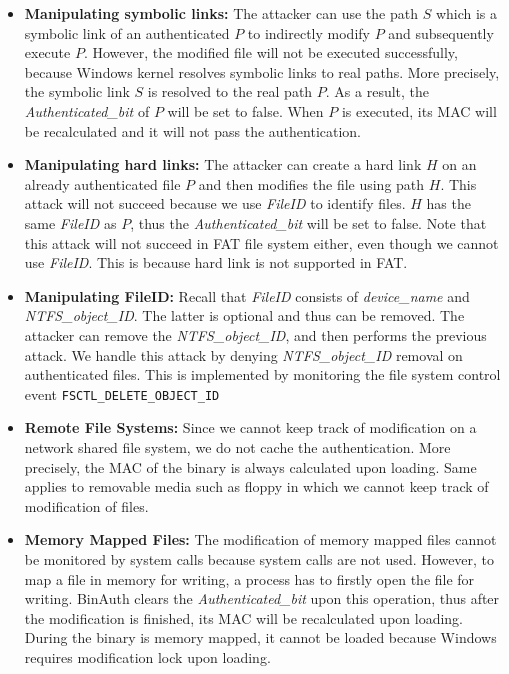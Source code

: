 \begin{itemize}
\item {\bf Manipulating symbolic links:}
The attacker can use the path $S$ which is a symbolic link of an authenticated $P$
to indirectly modify $P$ and subsequently execute $P$.
However, the modified file will not be executed successfully, because
Windows kernel resolves symbolic links to real paths.
More precisely, the symbolic link $S$ is resolved to the real path $P$.
As a result, the {\it Authenticated\_bit} of $P$ will be set to false.
When $P$ is executed, its MAC will be recalculated and it will not pass
the authentication.

\item {\bf Manipulating hard links:}
The attacker can create a hard link $H$ on an already authenticated file $P$
and then modifies the file using path $H$.
This attack will not succeed because we use {\it FileID} to identify files.
$H$ has the same {\it FileID} as $P$,
thus the {\it Authenticated\_bit} will be set to false.
Note that this attack will not succeed in FAT file system either,
even though we cannot use {\it FileID}.
This is because hard link is not supported in FAT.

\item {\bf Manipulating FileID:}
Recall that {\it FileID} consists of {\it device\linebreak[0]\_\linebreak[0]name}
and {\it NTFS\linebreak[0]\_\linebreak[0]object\linebreak[0]\_\linebreak[0]ID}.
The latter is optional and thus can be removed.
The attacker can remove the {\it NTFS\_object\_ID}, and then performs the previous attack.
We handle this attack by denying {\it NTFS\_object\_ID} removal on authenticated files.
This is implemented by monitoring the file system control event {\tt FSCTL\_DELETE\_OBJECT\_ID}

\item {\bf Remote File Systems:}
Since we cannot keep track of modification on a network shared file system,
we do not cache the authentication.
More precisely, the MAC of the binary is always calculated upon loading.
Same applies to removable media such as floppy in which we cannot
keep track of modification of files.

\item {\bf Memory Mapped Files:}
The modification of memory mapped files cannot be monitored by
system calls because system calls are not used.
However, to map a file in memory for writing, a process has to firstly open
the file for writing.
BinAuth clears the {\it Authenticated\_bit} upon this operation,
thus after the modification is finished, its MAC will be recalculated
upon loading.
During the binary is memory mapped, it cannot be loaded because
Windows requires modification lock upon loading.


\end{itemize}
